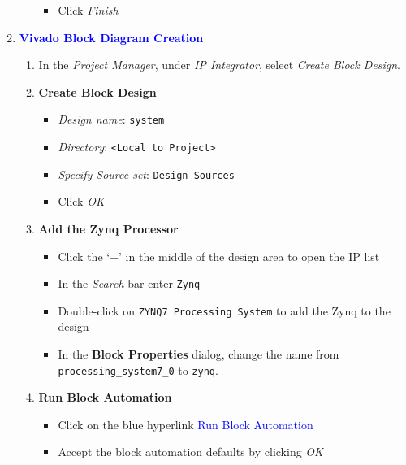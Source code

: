 \begin{enumerate}
\begin{enumerate}
%
\begin{itemize}
\item Click \emph{Finish}
\end{itemize}
%
\end{enumerate}
%
\item \textcolor{blue}{\textbf{Vivado Block Diagram Creation}}
%
\begin{enumerate}
%
\item In the \emph{Project Manager}, under \emph{IP Integrator},
select \emph{Create Block Design}.
%
\item {\bf Create Block Design}
%
\begin{itemize}
\item \emph{Design name}: \verb+system+
\item \emph{Directory}: \verb+<Local to Project>+
\item \emph{Specify Source set}: \verb+Design Sources+
\item Click \emph{OK}
\end{itemize}
%
\newpage
\item {\bf Add the Zynq Processor}
%
\begin{itemize}
\item Click the `+' in the middle of the design area to open the IP list
\item In the \emph{Search} bar enter \verb+Zynq+
\item Double-click on \verb+ZYNQ7 Processing System+ to add the Zynq to
the design
\item In the {\bf Block Properties} dialog, change the name from
\verb+processing_system7_0+ to \verb+zynq+.
\end{itemize}
%
\item {\bf Run Block Automation}
%
\begin{itemize}
\item Click on the blue hyperlink \textcolor{blue}{Run Block Automation}
\item Accept the block automation defaults by clicking \emph{OK}
\end{itemize}
%
\end{enumerate}
%
%

\end{enumerate}
